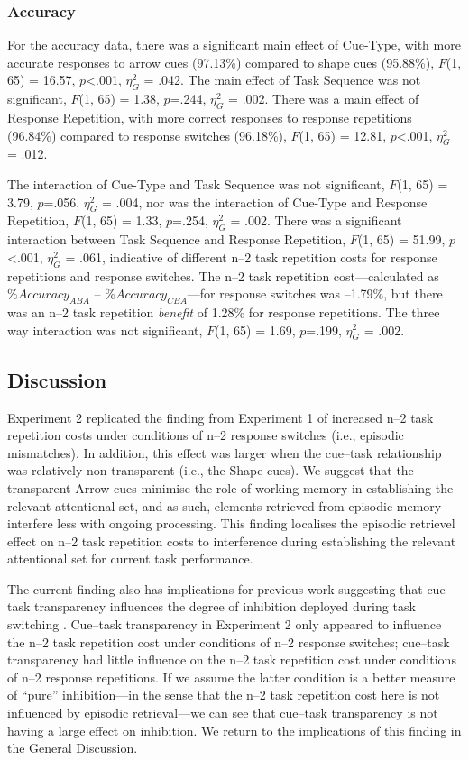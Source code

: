 \documentclass[a4paper, doc, natbib]{apa6}
\begin{document}
\subsubsection{Accuracy}
For the accuracy data, there was a significant main effect of Cue-Type, with more accurate responses to arrow cues (97.13\%) compared to shape cues (95.88\%), $F$(1, 65) = 16.57, $p$<.001, $\eta_G^2$ = .042. The main effect of Task Sequence was not significant, $F$(1, 65) = 1.38, $p$=.244, $\eta_G^2$ = .002. There was a main effect of Response Repetition, with more correct responses to response repetitions (96.84\%) compared to response switches (96.18\%), $F$(1, 65) = 12.81, $p$<.001, $\eta_G^2$ = .012.

The interaction of Cue-Type and Task Sequence was not significant, $F$(1, 65) = 3.79, $p$=.056, $\eta_G^2$ = .004, nor was the interaction of Cue-Type and Response Repetition, $F$(1, 65) = 1.33, $p$=.254, $\eta_G^2$ = .002. There was a significant interaction between Task Sequence and Response Repetition, $F$(1, 65) = 51.99, $p$<.001, $\eta_G^2$ = .061, indicative of different n--2 task repetition costs for response repetitions and response switches. The n--2 task repetition cost---calculated as $\%Accuracy_{ABA}$ -- $\%Accuracy_{CBA}$---for response switches was --1.79\%, but there was an n--2 task repetition \emph{benefit} of 1.28\% for response repetitions. The three way interaction was not significant, $F$(1, 65) = 1.69, $p$=.199, $\eta_G^2$ = .002.

\subsection{Discussion}
Experiment 2 replicated the finding from Experiment 1 of increased n--2 task repetition costs under conditions of n--2 response switches (i.e., episodic mismatches). In addition, this effect was larger when the cue--task relationship was relatively non-transparent (i.e., the Shape cues). We suggest that the transparent Arrow cues minimise the role of working memory in establishing the relevant attentional set, and as such, elements retrieved from episodic memory interfere less with ongoing processing. This finding localises the episodic retrievel effect on n--2 task repetition costs to interference during establishing the relevant attentional set for current task performance.

The current finding also has implications for previous work suggesting that cue--task transparency influences the degree of inhibition deployed during task switching \citep{Grange2009, Grange2010, Grange2015a, Houghton2009}. Cue--task transparency in Experiment 2 only appeared to influence the n--2 task repetition cost under conditions of n--2 response switches; cue--task transparency had little influence on the n--2 task repetition cost under conditions of n--2 response repetitions. If we assume the latter condition is a better measure of ``pure'' inhibition---in the sense that the n--2 task repetition cost here is not influenced by episodic retrieval---we can see that cue--task transparency is not having a large effect on inhibition. We return to the implications of this finding in the General Discussion. 
\end{document}
